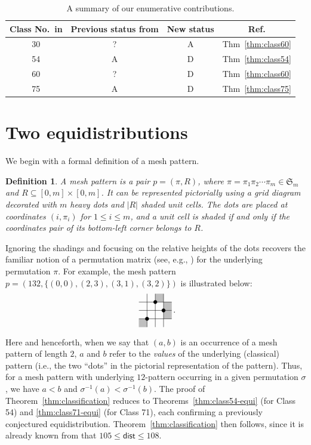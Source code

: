 \documentclass[12pt]{article}
\newtheorem{defn}[thm]{Definition}
\def\dist{\mathsf{dist}}
\newcommand{\pattern}[4]{										
	\raisebox{0.6ex}{
		\begin{tikzpicture}[scale=0.35, baseline=(current bounding box.center), #1]
		\foreach \x/\y in {#4}		\fill[gray!50] (\x,\y) rectangle +(1,1);

		\draw (0.01,0.01) grid (#2+0.99,#2+0.99);
		\foreach \x/\y in {#3}		\filldraw (\x,\y) circle (6pt);
		\end{tikzpicture}}
}
\begin{document}
\medskip

\begin{table}[h]
    \renewcommand{\arraystretch}{0.9}
    \centering
\begin{tabular}{|c|c|c|c|}
\hline
Class No.~in \cite{SKZ2026} & Previous status from \cite[Tab.~6]{SKZ2026} & New status & Ref. \\
\hline
30 & ? & A & Thm~\ref{thm:class60}\\
54 & A & D & Thm~\ref{thm:class54} \\
60 & ? & D & Thm~\ref{thm:class60}\\
75 & A & D & Thm~\ref{thm:class75} \\
\hline
\end{tabular}
\caption{A summary of our enumerative contributions.}\label{tab:summary}
\end{table}











\section{Two equidistributions}\label{sec:two_equidistributions}
We begin with a formal definition of a mesh pattern.
\begin{defn}\label{def:mesh pattern}
 A \emph{mesh pattern} is a pair $p = (\pi, R)$, where $\pi = \pi_1 \pi_2 \cdots \pi_m \in \mathfrak{S}_m$ and $R \subseteq [0,m] \times [0,m]$. It can be represented pictorially using a grid diagram decorated with $m$ heavy dots and $|R|$ shaded unit cells. The dots are placed at coordinates $(i, \pi_i)$ for $1 \le i \le m$, and a unit cell is shaded if and only if the coordinates pair of its bottom-left corner belongs to $R$.
\end{defn} 

Ignoring the shadings and focusing on the relative heights of the dots recovers the familiar notion of a permutation matrix (see, e.g., \cite[Section~1.5]{EC1}) for the underlying permutation $\pi$. For example, the mesh pattern $p = (132, \{(0,0), (2,3), (3,1), (3,2)\})$ is illustrated below:
$$
\pattern{scale=1}{3}{1/1,2/3,3/2}{0/0,2/3,3/1,3/2}\, .
$$

Here and henceforth, when we say that $(a,b)$ is an occurrence of a mesh pattern of length $2$, $a$ and $b$ refer to the {\em values} of the underlying (classical) pattern (i.e., the two ``dots'' in the pictorial representation of the pattern). Thus, for a mesh pattern with underlying $12$-pattern occurring in a given permutation $\sigma$, we have $a<b$ and $\sigma^{-1}(a)<\sigma^{-1}(b)$. The proof of Theorem~\ref{thm:classification} reduces to Theorems~\ref{thm:class54-equi} (for Class 54) and \ref{thm:class71-equi} (for Class 71), each confirming a previously conjectured equidistribution. Theorem~\ref{thm:classification} then follows, since it is already known from \cite{SKZ2026} that $105 \le \dist \le 108$. 
\end{document}
